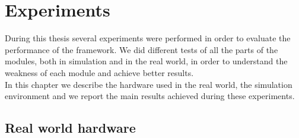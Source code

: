 \chapter{Experiments}\label{chap:experiments}
During this thesis several experiments were performed in order to evaluate the performance of the framework. We did different tests of all the parts of the modules, both in simulation and in the real world, in order to understand the weakness of each module and achieve better results.\\

In this chapter we describe the hardware used in the real world, the simulation environment and we report the main results achieved during these experiments.\\

\section{Real world hardware}
